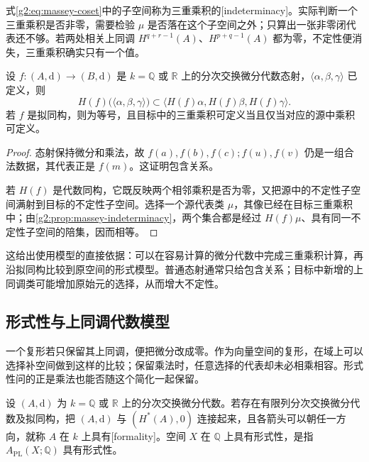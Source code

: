 式\eqref{g2:eq:massey-coset}中的子空间称为三重乘积的[indeterminacy]。实际判断一个三重乘积是否非零，需要检验 \(\mu\) 是否落在这个子空间之外；只算出一张非零闭代表还不够。若两处相关上同调 \(H^{q+r-1}(A)\)、\(H^{p+q-1}(A)\) 都为零，不定性便消失，三重乘积确实只有一个值。

\begin{proposition}\label{g2:prop:massey-quasi-isomorphism}
	设 \(f:(A,\mathrm d)\to(B,\mathrm d)\) 是 \(k=\mathbb Q\) 或 \(\mathbb R\) 上的分次交换微分代数态射，\(\langle\alpha,\beta,\gamma\rangle\) 已定义，则
	\[
		H(f)\bigl(\langle\alpha,\beta,\gamma\rangle\bigr)
		\subset\langle H(f)\alpha,H(f)\beta,H(f)\gamma\rangle.
	\]
	若 \(f\) 是拟同构，则为等号，且目标中的三重乘积可定义当且仅当对应的源中乘积可定义。
\end{proposition}
\begin{proof}
	态射保持微分和乘法，故 \(f(a),f(b),f(c);f(u),f(v)\) 仍是一组合法数据，其代表正是 \(f(m)\)。这证明包含关系。

	若 \(H(f)\) 是代数同构，它既反映两个相邻乘积是否为零，又把源中的不定性子空间满射到目标的不定性子空间。选择一个源代表类 \(\mu\)，其像已经在目标三重乘积中；由\cref{g2:prop:massey-indeterminacy}，两个集合都是经过 \(H(f)\mu\)、具有同一不定性子空间的陪集，因而相等。
\end{proof}

这给出使用模型的直接依据：可以在容易计算的微分代数中完成三重乘积计算，再沿拟同构比较到原空间的形式模型。普通态射通常只给包含关系；目标中新增的上同调类可能增加原始元的选择，从而增大不定性。

\subsection{形式性与上同调代数模型}
\label{g2:subsec:E04:03}

一个复形若只保留其上同调，便把微分改成零。作为向量空间的复形，在域上可以选择补空间做到这样的比较；保留乘法时，任意选择的代表却未必相乘相容。形式性问的正是乘法也能否随这个简化一起保留。

\begin{definition}\label{g2:def:formal-cdga}
	设 \((A,\mathrm d)\) 为 \(k=\mathbb Q\) 或 \(\mathbb R\) 上的分次交换微分代数。若存在有限列分次交换微分代数及拟同构，把 \((A,\mathrm d)\) 与 \((H^*(A),0)\) 连接起来，且各箭头可以朝任一方向，就称 \(A\) 在 \(k\) 上具有[formality]。空间 \(X\) 在 \(\mathbb Q\) 上具有形式性，是指 \(A_{\mathrm{PL}}(X;\mathbb Q)\) 具有形式性。
\end{definition}

